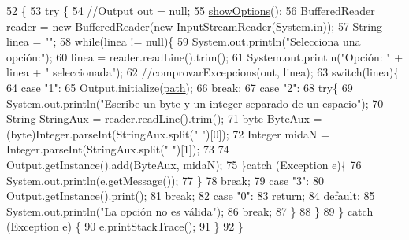 \begin{DoxyCode}
52                                            \{
53         \textcolor{keywordflow}{try} \{
54             \textcolor{comment}{//Output out = null;}
55             \hyperlink{classpersistencia_1_1output_1_1Driver____Output_a73ae13b88bf305d442012408333aae35}{showOptions}();
56             BufferedReader reader = \textcolor{keyword}{new} BufferedReader(\textcolor{keyword}{new} InputStreamReader(System.in));
57             String linea = \textcolor{stringliteral}{""};
58             \textcolor{keywordflow}{while}(linea != null)\{
59                 System.out.println(\textcolor{stringliteral}{"Selecciona una opción:"});
60                 linea = reader.readLine().trim();
61                 System.out.println(\textcolor{stringliteral}{"Opción: "} + linea + \textcolor{stringliteral}{" seleccionada"});
62                 \textcolor{comment}{//comprovarExcepcions(out, linea);}
63                 \textcolor{keywordflow}{switch}(linea)\{
64                     \textcolor{keywordflow}{case} \textcolor{stringliteral}{"1"}:
65                         Output.initialize(\hyperlink{classpersistencia_1_1output_1_1Driver____Output_a1701bae356c7bf388a5466895c22ff64}{path});
66                     \textcolor{keywordflow}{break};
67                     \textcolor{keywordflow}{case} \textcolor{stringliteral}{"2"}:
68                     \textcolor{keywordflow}{try}\{
69                         System.out.println(\textcolor{stringliteral}{"Escribe un byte y un integer separado de un espacio"});
70                         String StringAux = reader.readLine().trim();
71                         byte ByteAux = (byte)Integer.parseInt(StringAux.split(\textcolor{stringliteral}{" "})[0]);
72                         Integer midaN = Integer.parseInt(StringAux.split(\textcolor{stringliteral}{" "})[1]);
73                         
74                         Output.getInstance().add(ByteAux, midaN);
75                     \}\textcolor{keywordflow}{catch} (Exception e)\{
76                         System.out.println(e.getMessage());
77                     \}
78                     \textcolor{keywordflow}{break};
79                     \textcolor{keywordflow}{case} \textcolor{stringliteral}{"3"}:
80                         Output.getInstance().print();
81                     \textcolor{keywordflow}{break};
82                     \textcolor{keywordflow}{case} \textcolor{stringliteral}{"0"}:
83                         \textcolor{keywordflow}{return};
84                     \textcolor{keywordflow}{default}:
85                         System.out.println(\textcolor{stringliteral}{"La opción no es válida"});
86                     \textcolor{keywordflow}{break};
87                 \}
88             \}
89         \} \textcolor{keywordflow}{catch} (Exception e) \{
90             e.printStackTrace();
91         \}
92     \}
\end{DoxyCode}

